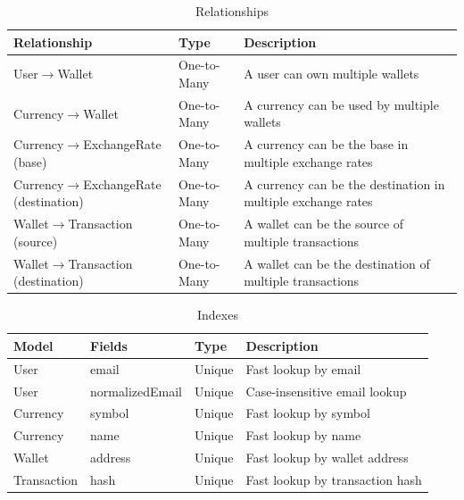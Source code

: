 \begin{table}[htbp]
  \centering
  \caption{Relationships}
  \renewcommand{\arraystretch}{1.5}
  \begin{tabular}{|p{5.5cm}|p{3cm}|p{6cm}|}
    \hline
    \textbf{Relationship} & \textbf{Type} & \textbf{Description} \\
    \hline
    User$\rightarrow$Wallet & One-to-Many & A user can own multiple wallets \\
    \hline
    Currency$\rightarrow$Wallet & One-to-Many & A currency can be used by multiple wallets \\
    \hline
    Currency$\rightarrow$ExchangeRate (base) & One-to-Many & A currency can be the base in multiple exchange rates \\
    \hline
    Currency$\rightarrow$ExchangeRate (destination) & One-to-Many & A currency can be the destination in multiple exchange rates \\
    \hline
    Wallet$\rightarrow$Transaction (source) & One-to-Many & A wallet can be the source of multiple transactions \\
    \hline
    Wallet$\rightarrow$Transaction (destination) & One-to-Many & A wallet can be the destination of multiple transactions \\
    \hline
  \end{tabular}
\end{table}

\begin{table}[htbp]
  \centering
  \caption{Indexes}
  \renewcommand{\arraystretch}{1.5}
  \begin{tabular}{|p{3cm}|p{3cm}|p{3cm}|p{6cm}|}
    \hline
    \textbf{Model} & \textbf{Fields} & \textbf{Type} & \textbf{Description} \\
    \hline
    User & email & Unique & Fast lookup by email \\
    \hline
    User & normalizedEmail & Unique & Case-insensitive email lookup \\
    \hline
    Currency & symbol & Unique & Fast lookup by symbol \\
    \hline
    Currency & name & Unique & Fast lookup by name \\
    \hline
    Wallet & address & Unique & Fast lookup by wallet address \\
    \hline
    Transaction & hash & Unique & Fast lookup by transaction hash \\
    \hline
  \end{tabular}
\end{table}

